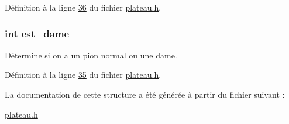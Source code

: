 Définition à la ligne \hyperlink{plateau_8h_source_l00036}{36} du fichier \hyperlink{plateau_8h_source}{plateau.h}.

\hypertarget{structpion_a13d497ed763d6eba18df86caf4c85861}{
\subsubsection[{est\_\-dame}]{\setlength{\rightskip}{0pt plus 5cm}int {\bf est\_\-dame}}}
\label{structpion_a13d497ed763d6eba18df86caf4c85861}
Détermine si on a un pion normal ou une dame. 

Définition à la ligne \hyperlink{plateau_8h_source_l00035}{35} du fichier \hyperlink{plateau_8h_source}{plateau.h}.



La documentation de cette structure a été générée à partir du fichier suivant :\begin{DoxyCompactItemize}
\item 
\hyperlink{plateau_8h}{plateau.h}\end{DoxyCompactItemize}
